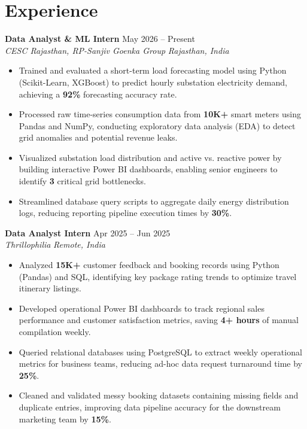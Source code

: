 \documentclass[10pt,letterpaper]{article}
\newcommand{\job}[4]{%
  \textbf{#1} \hfill {\small #3}\\[-1pt]
  \textit{#2} \hfill {\small \textit{#4}}%
}
\begin{document}
\vspace{3pt}

\section{Experience}

\job{Data Analyst \& ML Intern}{CESC Rajasthan, RP-Sanjiv Goenka Group}{May 2026 -- Present}{Rajasthan, India}
\begin{itemize}
  \item Trained and evaluated a short-term load forecasting model using Python (Scikit-Learn, XGBoost) to predict hourly substation electricity demand, achieving a \textbf{92\%} forecasting accuracy rate.
  \item Processed raw time-series consumption data from \textbf{10K+} smart meters using Pandas and NumPy, conducting exploratory data analysis (EDA) to detect grid anomalies and potential revenue leaks.
  \item Visualized substation load distribution and active vs. reactive power by building interactive Power BI dashboards, enabling senior engineers to identify \textbf{3} critical grid bottlenecks.
  \item Streamlined database query scripts to aggregate daily energy distribution logs, reducing reporting pipeline execution times by \textbf{30\%}.
\end{itemize}

\vspace{3pt}

\job{Data Analyst Intern}{Thrillophilia}{Apr 2025 -- Jun 2025}{Remote, India}
\begin{itemize}
  \item Analyzed \textbf{15K+} customer feedback and booking records using Python (Pandas) and SQL, identifying key package rating trends to optimize travel itinerary listings.
  \item Developed operational Power BI dashboards to track regional sales performance and customer satisfaction metrics, saving \textbf{4+ hours} of manual compilation weekly.
  \item Queried relational databases using PostgreSQL to extract weekly operational metrics for business teams, reducing ad-hoc data request turnaround time by \textbf{25\%}.
  \item Cleaned and validated messy booking datasets containing missing fields and duplicate entries, improving data pipeline accuracy for the downstream marketing team by \textbf{15\%}.
\end{itemize}
\end{document}
